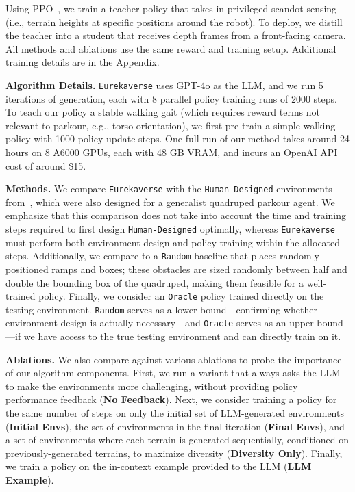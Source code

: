 \documentclass{article}
\newcommand{\ourmethod}{\texttt{Eurekaverse}\xspace}
\begin{document}
Using PPO~\citep{schulman2017proximal}, we train a teacher policy that takes in privileged scandot sensing (i.e., terrain heights at specific positions around the robot). To deploy, we distill the teacher into a student that receives depth frames from a front-facing camera. All methods and ablations use the same reward and training setup. Additional training details are in the Appendix.

\textbf{Algorithm Details.} \ourmethod uses GPT-4o as the LLM, and we run 5 iterations of generation, each with 8 parallel policy training runs of 2000 steps. To teach our policy a stable walking gait (which requires reward terms not relevant to parkour, e.g., torso orientation), we first pre-train a simple walking policy with 1000 policy update steps. One full run of our method takes around 24 hours on 8 A6000 GPUs, each with 48 GB VRAM, and incurs an OpenAI API cost of around \$15.

\textbf{Methods.} We compare \ourmethod with the \texttt{Human-Designed} environments from~\citet{cheng2023extreme}, which were also designed for a generalist quadruped parkour agent. We emphasize that this comparison does not take into account the time and training steps required to first design \texttt{Human-Designed} optimally, whereas \ourmethod must perform both environment design and policy training within the allocated steps. Additionally, we compare to a \texttt{Random} baseline that places randomly positioned ramps and boxes; these obstacles are sized randomly between half and double the bounding box of the quadruped, making them feasible for a well-trained policy. Finally, we consider an \texttt{Oracle} policy trained directly on the testing environment. \texttt{Random} serves as a lower bound—confirming whether environment design is actually necessary—and \texttt{Oracle} serves as an upper bound—if we have access to the true testing environment and can directly train on it.

\textbf{Ablations.} We also compare against various ablations to probe the importance of our algorithm components. First, we run a variant that always asks the LLM to make the environments more challenging, without providing policy performance feedback (\textbf{No Feedback}). Next, we consider training a policy for the same number of steps on only the initial set of LLM-generated environments (\textbf{Initial Envs}), the set of environments in the final iteration (\textbf{Final Envs}), and a set of environments where each terrain is generated sequentially, conditioned on previously-generated terrains, to maximize diversity (\textbf{Diversity Only}). Finally, we train a policy on the in-context example provided to the LLM (\textbf{LLM Example}).
\end{document}
